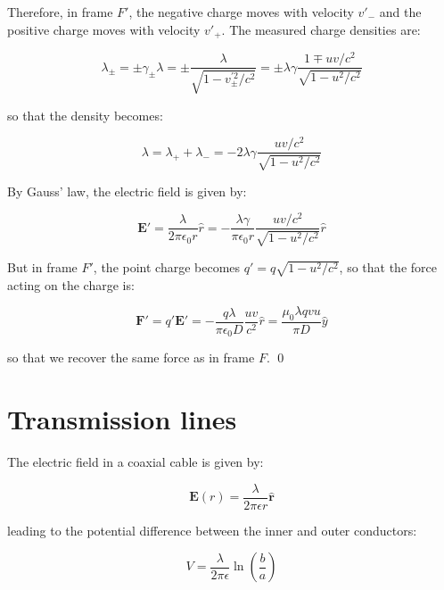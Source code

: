 \documentclass[12pt]{article}
\begin{document}
Therefore, in frame $F'$, the negative charge moves with velocity $v'_{-}$ and the positive charge moves with velocity $v'_{+}$. The measured charge densities are:

\begin{equation}
    \lambda_{\pm} = \pm \gamma_{\pm} \lambda = \pm \frac{\lambda}{\sqrt{1 - v_{\pm}^{'2}/c^{2}}} = \pm \lambda \gamma \frac{1 \mp uv/c^{2}}{\sqrt{1 - u^{2}/c^{2}}}
\end{equation}

so that the density becomes:

\begin{equation}
    \lambda = \lambda_{+} + \lambda_{-} = -2\lambda \gamma \frac{uv/c^{2}}{\sqrt{1 - u^{2}/c^{2}}}
\end{equation}

By Gauss' law, the electric field is given by:

\begin{equation}
    \mathbf{E}' = \frac{\lambda}{2\pi\epsilon_{0} r} \hat{r} = -\frac{\lambda \gamma}{\pi\epsilon_{0} r} \frac{uv/c^{2}}{\sqrt{1 - u^{2}/c^{2}}} \hat{r}
\end{equation}

But in frame $F'$, the point charge becomes $q' = q\sqrt{1 - u^{2}/c^{2}}$, so that the force acting on the charge is:

\begin{equation}
    \mathbf{F}' = q'\mathbf{E}' = -\frac{q \lambda}{\pi\epsilon_{0} D} \frac{uv}{c^{2}} \hat{r} = \frac{\mu_{0} \lambda q vu}{\pi D} \hat{y}
\end{equation}

so that we recover the same force as in frame $F$.
\qed


\pagebreak
\section*{Transmission lines}



The electric field in a coaxial cable is given by:

\begin{equation}
    \mathbf{E}(r) = \frac{\lambda}{2\pi\epsilon r} \hat{\mathbf{r}}
\end{equation}

leading to the potential difference between the inner and outer conductors:

\begin{equation}
    V = \frac{\lambda}{2\pi\epsilon} \ln{\left( \frac{b}{a} \right)}
\end{equation}
\end{document}
